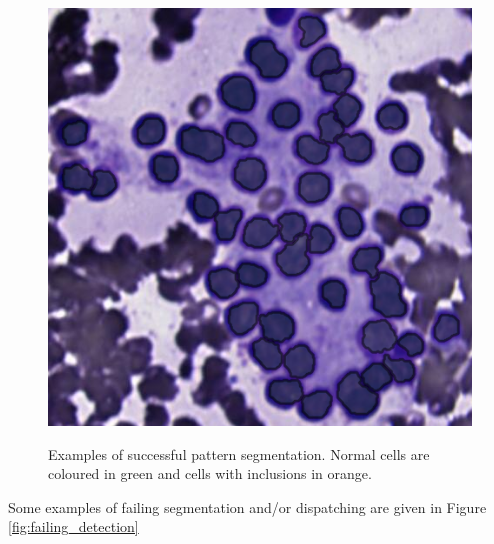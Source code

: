 \begin{figure}
{		\includegraphics[scale=0.5]{image/success_reseg_2_nopat.png}
	}
	\caption{Examples of successful pattern segmentation. Normal cells are coloured in green and cells with inclusions in orange.}
	\label{fig:pattern_success_full_reseg}
\end{figure}

Some examples of failing segmentation and/or dispatching are given in Figure \ref{fig:failing_detection} 

